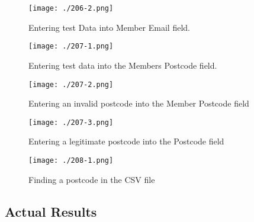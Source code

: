 \begin{figure}[H]
    \texttt{[image: ./206-2.png]}
    \caption{Entering test Data into Member Email field.} \label{fig:test2_email}
\end{figure}

\begin{figure}[H]
    \texttt{[image: ./207-1.png]}
    \caption{Entering test data into the Members Postcode field.} \label{fig:postcode_test}
\end{figure}

\begin{figure}[H]
    \texttt{[image: ./207-2.png]}
    \caption{Entering an invalid postcode into the Member Postcode field} \label{fig:large_postcode}
\end{figure}

\begin{figure}[H]
    \texttt{[image: ./207-3.png]}
    \caption{Entering a legitimate postcode into the Postcode field} \label{fig:legit_postcode}
\end{figure}

\begin{figure}[H]
    \texttt{[image: ./208-1.png]}
    \caption{Finding a postcode in the CSV file} \label{fig:find_postcode}
\end{figure}





\pagebreak

\subsection{Actual Results}

